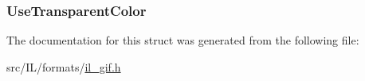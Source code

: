 \hypertarget{struct_gif_loading_context_a3331e3fa106eab93f9f26aeaa5cfb8a6}{
\subsubsection[{Use\-Transparent\-Color}]{ Use\-Transparent\-Color}}\label{struct_gif_loading_context_a3331e3fa106eab93f9f26aeaa5cfb8a6}


The documentation for this struct was generated from the following file\-:\begin{DoxyCompactItemize}
\item 
src/\-I\-L/formats/\hyperlink{il__gif_8h}{il\-\_\-gif.\-h}\end{DoxyCompactItemize}
